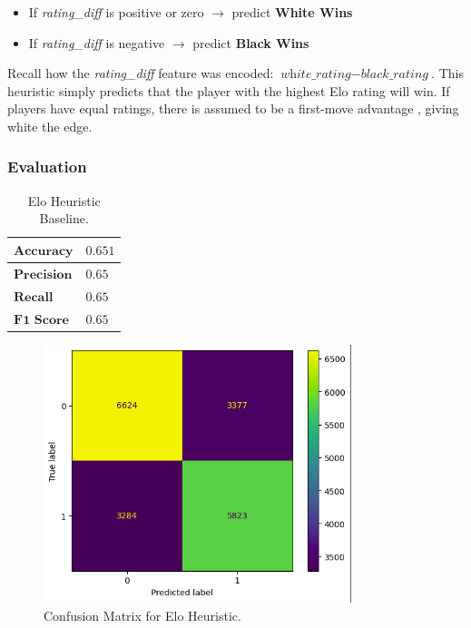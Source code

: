 \documentclass[12pt]{article}
\begin{document}
\begin{itemize}
  \item If \textit{rating\_diff} is positive or zero $\rightarrow$ predict \textbf{White Wins}
  \item If \textit{rating\_diff} is negative $\rightarrow$ predict \textbf{Black Wins}
\end{itemize}

 Recall how the \textit{rating\_diff} feature was encoded: $\textit{white\_rating} - \textit{black\_rating}$. This heuristic simply predicts that the player with the highest Elo rating will win. If players have equal ratings, there is assumed to be a first-move advantage \cite{Streeter1946}, giving white the edge.

\subsubsection{Evaluation}

\begin{table}[H]
\centering
\begin{tabular}{|l|l|}
\hline
$\textbf{Accuracy}$ & $0.651$ \\ \hline
$\textbf{Precision}$ & $0.65$ \\ \hline
$\textbf{Recall}$ & $0.65$ \\ \hline
$\textbf{F1 Score}$ & $0.65$ \\ \hline
\end{tabular}
\caption{Elo Heuristic Baseline.}
\label{tab:el-baseline}
\end{table}

\begin{figure}[H]
\centering
\includegraphics[width=0.8\textwidth]{conf-matrix-elo.png}
\caption{Confusion Matrix for Elo Heuristic.}
\label{fig:conf-matrix-elo}
\end{figure}
\end{document}
